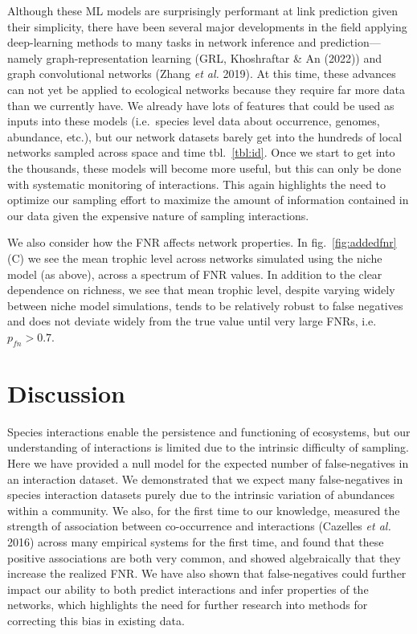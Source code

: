 \documentclass[10pt,oneside]{article}
\begin{document}
Although these ML models are surprisingly performant at link prediction
given their simplicity, there have been several major developments in
the field applying deep-learning methods to many tasks in network
inference and prediction---namely graph-representation learning (GRL,
Khoshraftar \& An (2022)) and graph convolutional networks (Zhang
\emph{et al.} 2019). At this time, these advances can not yet be applied
to ecological networks because they require far more data than we
currently have. We already have lots of features that could be used as
inputs into these models (i.e.~species level data about occurrence,
genomes, abundance, etc.), but our network datasets barely get into the
hundreds of local networks sampled across space and time
tbl.~\ref{tbl:id}. Once we start to get into the thousands, these models
will become more useful, but this can only be done with systematic
monitoring of interactions. This again highlights the need to optimize
our sampling effort to maximize the amount of information contained in
our data given the expensive nature of sampling interactions.

We also consider how the FNR affects network properties. In
fig.~\ref{fig:addedfnr}(C) we see the mean trophic level across networks
simulated using the niche model (as above), across a spectrum of FNR
values. In addition to the clear dependence on richness, we see that
mean trophic level, despite varying widely between niche model
simulations, tends to be relatively robust to false negatives and does
not deviate widely from the true value until very large FNRs,
i.e.~\(p_{fn} > 0.7\).

\hypertarget{discussion}{%
\section{Discussion}\label{discussion}}

Species interactions enable the persistence and functioning of
ecosystems, but our understanding of interactions is limited due to the
intrinsic difficulty of sampling. Here we have provided a null model for
the expected number of false-negatives in an interaction dataset. We
demonstrated that we expect many false-negatives in species interaction
datasets purely due to the intrinsic variation of abundances within a
community. We also, for the first time to our knowledge, measured the
strength of association between co-occurrence and interactions (Cazelles
\emph{et al.} 2016) across many empirical systems for the first time,
and found that these positive associations are both very common, and
showed algebraically that they increase the realized FNR. We have also
shown that false-negatives could further impact our ability to both
predict interactions and infer properties of the networks, which
highlights the need for further research into methods for correcting
this bias in existing data.
\end{document}
